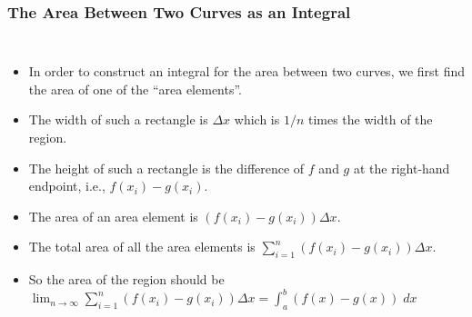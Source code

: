 \documentclass[serif,ignorenonframetext]{beamer}
\newcommand{\ds}{\displaystyle}
\begin{document}
\begin{frame}
  \frametitle{The Area Between Two Curves as an Integral}
  \begin{columns}
  \begin{itemize}[<+->]
  \item In order to construct an integral for the area between
    two curves, we first find the area of one of the ``area
    elements''.
  \item The width of such a rectangle is $\Delta x$ which is $1/n$
    times the width of the region.
  \item The height of such a rectangle is the difference of $f$ and
    $g$ at the right-hand endpoint, i.e., $f(x_i)-g(x_i)$.
  \item The area of an area element is $(f(x_i)-g(x_i))\Delta x$.
  \item The total area of all the area elements is
    $\ds \sum_{i=1}^n (f(x_i)-g(x_i)) \Delta x$.
  \item So the area of the region should be $\ds \lim_{n\to\infty}
    \sum_{i=1}^n (f(x_i)-g(x_i))\Delta x = \int_a^b (f(x)-g(x)) \; dx$
  \end{itemize}
  \end{columns}
\end{frame}
\end{document}
